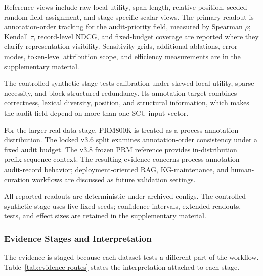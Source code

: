\documentclass[a4paper,fleqn]{cas-sc}
\begin{document}
Reference views include raw local utility, span length, relative position, seeded random field assignment, and stage-specific scalar views. The primary readout is annotation-order tracking for the audit-priority field, measured by Spearman $\rho$; Kendall $\tau$, record-level NDCG, and fixed-budget coverage are reported where they clarify representation visibility. Sensitivity grids, additional ablations, error modes, token-level attribution scope, and efficiency measurements are in the supplementary material.

The controlled synthetic stage tests calibration under skewed local utility, sparse necessity, and block-structured redundancy. Its annotation target combines correctness, lexical diversity, position, and structural information, which makes the audit field depend on more than one SCU input vector.

For the larger real-data stage, PRM800K is treated as a process-annotation distribution. The locked v3.6 split examines annotation-order consistency under a fixed audit budget. The v3.8 frozen PRM reference provides in-distribution prefix-sequence context. The resulting evidence concerns process-annotation audit-record behavior; deployment-oriented RAG, KG-maintenance, and human-curation workflows are discussed as future validation settings.

All reported readouts are deterministic under archived configs. The controlled synthetic stage uses five fixed seeds; confidence intervals, extended readouts, tests, and effect sizes are retained in the supplementary material.

\subsubsection{Evidence Stages and Interpretation}

The evidence is staged because each dataset tests a different part of the workflow. Table~\ref{tab:evidence-routes} states the interpretation attached to each stage.
\end{document}
